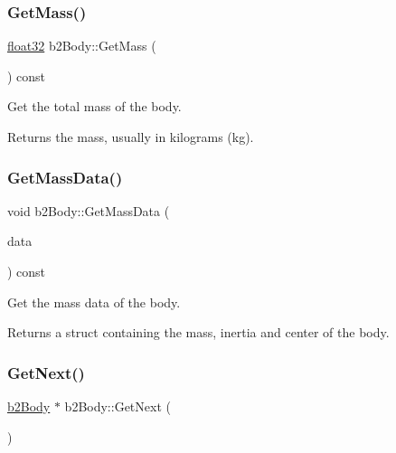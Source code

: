 \subsubsection{\texorpdfstring{GetMass()}{GetMass()}}
{\footnotesize\ttfamily \mbox{\hyperlink{b2_settings_8h_aacdc525d6f7bddb3ae95d5c311bd06a1}{float32}} b2\+Body\+::\+Get\+Mass (\begin{DoxyParamCaption}{ }\end{DoxyParamCaption}) const\hspace{0.3cm}{\ttfamily [inline]}}

Get the total mass of the body. \begin{DoxyReturn}{Returns}
the mass, usually in kilograms (kg). 
\end{DoxyReturn}
\mbox{\label{classb2_body_a5100927dbd39dd0addea79d5f323f3f1}} 
\subsubsection{\texorpdfstring{GetMassData()}{GetMassData()}}
{\footnotesize\ttfamily void b2\+Body\+::\+Get\+Mass\+Data (\begin{DoxyParamCaption}\item[{\mbox{\hyperlink{structb2_mass_data}{b2\+Mass\+Data}} $\ast$}]{data }\end{DoxyParamCaption}) const\hspace{0.3cm}{\ttfamily [inline]}}

Get the mass data of the body. \begin{DoxyReturn}{Returns}
a struct containing the mass, inertia and center of the body. 
\end{DoxyReturn}
\mbox{\label{classb2_body_ad54182a11d02362b027a0eb072775bdc}} 
\subsubsection{\texorpdfstring{GetNext()}{GetNext()}\hspace{0.1cm}{\footnotesize\ttfamily [1/2]}}
{\footnotesize\ttfamily \mbox{\hyperlink{classb2_body}{b2\+Body}} $\ast$ b2\+Body\+::\+Get\+Next (\begin{DoxyParamCaption}{ }\end{DoxyParamCaption})\hspace{0.3cm}{\ttfamily [inline]}}



